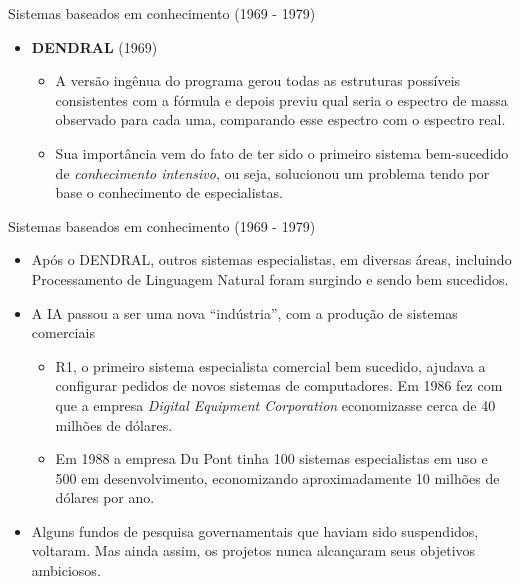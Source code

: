 \documentclass{libs/ufc_format}
\begin{document}
\begin{frame}{Sistemas baseados em conhecimento (1969 - 1979)}
    \begin{itemize}
        \justifying
        \item \textbf{DENDRAL} (1969)
            \begin{itemize}
                \justifying
                \item A versão ingênua do programa gerou todas as estruturas possíveis consistentes com a fórmula e depois previu qual seria o espectro de massa observado para cada uma, comparando esse espectro com o espectro real.
                \item<2> Sua importância vem do fato de ter sido o primeiro sistema bem-sucedido de \textit{conhecimento intensivo}, ou seja, solucionou um problema tendo por base o conhecimento de especialistas.
            \end{itemize}
    \end{itemize}
\end{frame}

\begin{frame}{Sistemas baseados em conhecimento (1969 - 1979)}
    \begin{itemize}
        \justifying
        \item Após o DENDRAL, outros sistemas especialistas, em diversas áreas, incluindo Processamento de Linguagem Natural foram surgindo e sendo bem sucedidos.
        \item<2-> A IA passou a ser uma nova ``indústria'', com a produção de sistemas comerciais
            \begin{itemize}
                \justifying
                \item<3-4> R1, o primeiro sistema especialista comercial bem sucedido, ajudava a configurar pedidos de novos sistemas de computadores. Em 1986 fez com que a empresa \textit{Digital Equipment Corporation} economizasse cerca de 40 milhões de dólares.
                \item<4> Em 1988 a empresa Du Pont tinha 100 sistemas especialistas em uso e 500 em desenvolvimento, economizando aproximadamente 10 milhões de dólares por ano.
            \end{itemize}
        \item<5> Alguns fundos de pesquisa governamentais que haviam sido suspendidos, voltaram. Mas ainda assim, os projetos nunca alcançaram seus objetivos ambiciosos.
    \end{itemize}
\end{frame}
\end{document}
